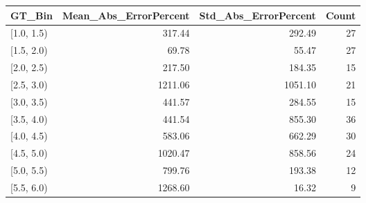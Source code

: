 \begin{tabular}{lrrr}
\toprule
GT_Bin & Mean_Abs_ErrorPercent & Std_Abs_ErrorPercent & Count \\
\midrule
[1.0, 1.5) & 317.44 & 292.49 & 27 \\
[1.5, 2.0) & 69.78 & 55.47 & 27 \\
[2.0, 2.5) & 217.50 & 184.35 & 15 \\
[2.5, 3.0) & 1211.06 & 1051.10 & 21 \\
[3.0, 3.5) & 441.57 & 284.55 & 15 \\
[3.5, 4.0) & 441.54 & 855.30 & 36 \\
[4.0, 4.5) & 583.06 & 662.29 & 30 \\
[4.5, 5.0) & 1020.47 & 858.56 & 24 \\
[5.0, 5.5) & 799.76 & 193.38 & 12 \\
[5.5, 6.0) & 1268.60 & 16.32 & 9 \\
\bottomrule
\end{tabular}
